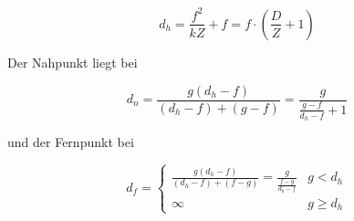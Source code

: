 \begin{equation}
	d_h=\frac{f^2}{kZ}+f=f\cdot \left(\frac{D}{Z}+1\right)
\label{eq:hyperfok}
\end{equation}

Der Nahpunkt liegt bei 

\begin{equation}
	d_n=\frac{g(d_h-f)}{(d_h-f)+(g-f)}=\frac{g}{\frac{g-f}{d_h-f}+1}
\label{eq:nahpunkt}
\end{equation}

und der Fernpunkt bei

\begin{equation}
	d_f=\begin{cases}
		\frac{g(d_h-f)}{(d_h-f)+(f-g)}=\frac{g}{\frac{f-g}{d_h-f}} & g<d_h \\
		\infty & g \geq d_h
		\end{cases}
\label{eq:fernpunkt}
\end{equation}

